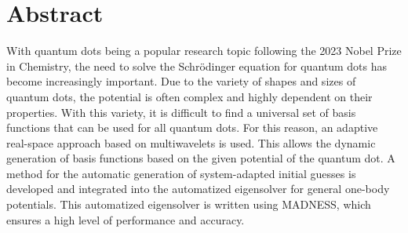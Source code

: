 \chapter*{Abstract}

With quantum dots being a popular research topic following the 2023 Nobel Prize in Chemistry, the need to solve the Schrödinger equation for quantum dots has become increasingly important. 
Due to the variety of shapes and sizes of quantum dots, the potential is often complex and highly dependent on their properties. 
With this variety, it is difficult to find a universal set of basis functions that can be used for all quantum dots. 
For this reason, an adaptive real-space approach based on multiwavelets is used.
This allows the dynamic generation of basis functions based on the given potential of the quantum dot.
A method for the automatic generation of system-adapted initial guesses is developed and integrated into the automatized eigensolver for general one-body potentials.
This automatized eigensolver is written using MADNESS, which ensures a high level of performance and accuracy.